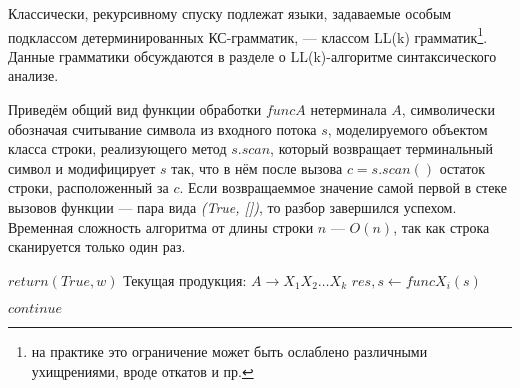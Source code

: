 \documentclass[10pt]{article}         %
\begin{document}
	Классически, рекурсивному спуску подлежат языки, задаваемые особым подклассом детерминированных КС-грамматик, --- классом LL(k) грамматик\footnote{на практике это ограничение может быть ослаблено различными ухищрениями, вроде откатов и пр.}. Данные грамматики обсуждаются в разделе о LL(k)-алгоритме синтаксического анализе. 
	
	Приведём общий вид функции обработки $funcA$ нетерминала $A$, символически обозначая считывание символа из входного потока $s$, моделируемого объектом класса строки, реализующего метод $s.scan$, который возвращает терминальный символ и модифицирует $s$ так, что в нём после вызова $c=s.scan()$ остаток строки, расположенный за $c$. Если возвращаеммое значение самой первой в стеке вызовов функции  --- пара вида \textit{(True, [])}, то разбор завершился успехом. Временная сложность алгоритма от длины строки $n$ --- $O(n)$, так как строка сканируется только один раз.
	
	\begin{algorithm}[tbh]\label{alg:RD}
		\begin{algorithmic}
			\State $return (True,w)$
			\EndIf
			\State Текущая продукция: $A \to {X_1X_2\dots{X_k}}$
			\State $res, s \gets funcX_i(s)$
			\EndIf
			
			\Else
			\State $continue$
			\EndIf
			\Else
			\EndIf
			\EndFor
			
			
			
		\end{algorithmic}
	\end{algorithm}
	
\end{document}
